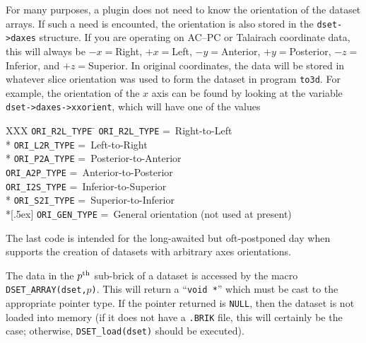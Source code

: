   For many purposes, a plugin does not need to know the orientation of the
  dataset arrays.  If such a need is encounted,
  the orientation is also stored in the {\tt dset->daxes}
  structure.  If you are operating on AC--PC or Talairach coordinate data, this will
  always be $-x={}$Right, $+x={}$Left, $-y={}$Anterior, $+y={}$Posterior,
  $-z={}$Inferior, and $+z={}$Superior.  In original coordinates, the data
  will be stored in whatever slice orientation was used to form the dataset
  in program {\tt to3d}.  For example, the orientation of the $x$ axis can
  be found by looking at the variable {\tt dset->daxes->xxorient},
  which will have one of the values
\begin{tabbing}
  XXX \= {\tt ORI\_R2L\_TYPE} \= \kill
      \> {\tt ORI\_R2L\_TYPE} \> =~Right-to-Left \\*
      \> {\tt ORI\_L2R\_TYPE} \> =~Left-to-Right \\*
      \> {\tt ORI\_P2A\_TYPE} \> =~Posterior-to-Anterior \\
      \> {\tt ORI\_A2P\_TYPE} \> =~Anterior-to-Posterior \\
      \> {\tt ORI\_I2S\_TYPE} \> =~Inferior-to-Superior \\*
      \> {\tt ORI\_S2I\_TYPE} \> =~Superior-to-Inferior \\*[.5ex]
      \> {\tt ORI\_GEN\_TYPE} \> =~General orientation (not used at present)
\end{tabbing}
  The last code is intended for the long-awaited but oft-postponed day when
  \afnit supports the creation of datasets with arbitrary axes orientations.

\label{Subbricks}
  The data in the $p^{\rm th}$ sub-brick of a dataset is accessed by
  the macro {\tt DSET\_ARRAY(dset,$p$)}.  This will return a ``{\tt void *}''
  which must be cast to the appropriate pointer type.  If the pointer
  returned is {\tt NULL}, then the dataset is not loaded into memory
  (if it does not have a {\tt .BRIK} file, this will certainly be the case; otherwise,
   {\tt DSET\_load(dset)} should be executed).

